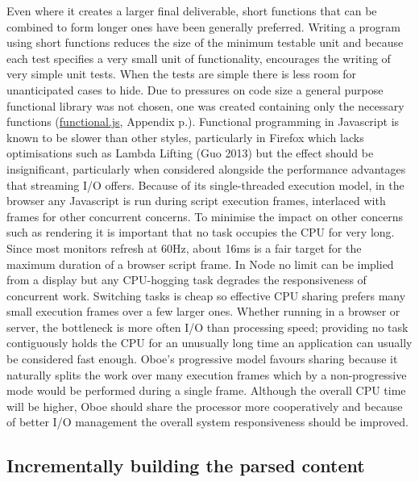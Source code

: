\documentclass[12pt, ]{article}
\begin{document}
Even where it creates a larger final deliverable, short functions that
can be combined to form longer ones have been generally preferred.
Writing a program using short functions reduces the size of the minimum
testable unit and because each test specifies a very small unit of
functionality, encourages the writing of very simple unit tests. When
the tests are simple there is less room for unanticipated cases to hide.
Due to pressures on code size a general purpose functional library was
not chosen, one was created containing only the necessary functions
(\hyperref[headerux5ffunctional]{functional.js}, Appendix
p.\pageref{src_functional}). Functional programming in Javascript is
known to be slower than other styles, particularly in Firefox which
lacks optimisations such as Lambda Lifting (Guo 2013) but the effect
should be insignificant, particularly when considered alongside the
performance advantages that streaming I/O offers. Because of its
single-threaded execution model, in the browser any Javascript is run
during script execution frames, interlaced with frames for other
concurrent concerns. To minimise the impact on other concerns such as
rendering it is important that no task occupies the CPU for very long.
Since most monitors refresh at 60Hz, about 16ms is a fair target for the
maximum duration of a browser script frame. In Node no limit can be
implied from a display but any CPU-hogging task degrades the
responsiveness of concurrent work. Switching tasks is cheap so effective
CPU sharing prefers many small execution frames over a few larger ones.
Whether running in a browser or server, the bottleneck is more often I/O
than processing speed; providing no task contiguously holds the CPU for
an unusually long time an application can usually be considered fast
enough. Oboe's progressive model favours sharing because it naturally
splits the work over many execution frames which by a non-progressive
mode would be performed during a single frame. Although the overall CPU
time will be higher, Oboe should share the processor more cooperatively
and because of better I/O management the overall system responsiveness
should be improved.

\subsection{Incrementally building the parsed
content}\label{incrementally-building-the-parsed-content}
\end{document}
